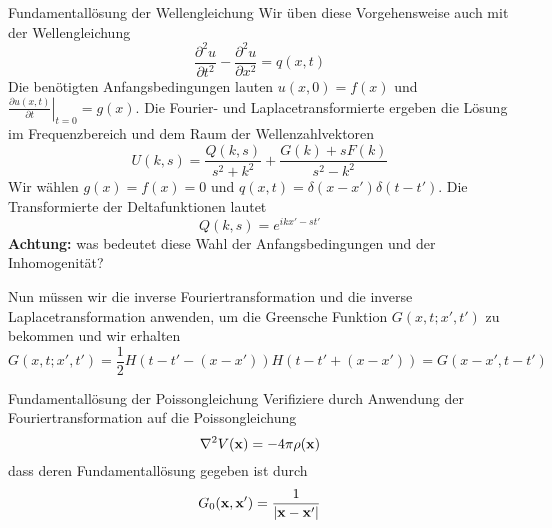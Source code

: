 \begin{example}{Fundamentallösung der Wellengleichung}
Wir üben diese Vorgehensweise auch mit der Wellengleichung
\begin{equation}
	\frac{\partial^2 u}{\partial t^2}-\frac{\partial^2 u}{\partial x^2}=q(x,t)
	\label{eqnwave}
\end{equation}
Die benötigten Anfangsbedingungen lauten $u(x,0)=f(x)$ und $\left.\frac{\partial
u(x,t)}{\partial t}\right|_{t=0}=g(x)$. Die Fourier- und Laplacetransformierte
ergeben die Lösung im Frequenzbereich und dem Raum der Wellenzahlvektoren 
\begin{equation}
	U(k,s)=\frac{Q(k,s)}{s^2+k^2}+\frac{G(k)+sF(k)}{s^2-k^2}
	\label{eqnuofkands}
\end{equation}
Wir wählen $g(x)=f(x)=0$ und $q(x,t)=\delta(x-x')\delta(t-t')$. Die
Transformierte der Deltafunktionen lautet
\[ Q(k,s)=e^{ikx'-st'}\]
{\bf Achtung:} was bedeutet diese Wahl der Anfangsbedingungen und der Inhomogenität?

Nun müssen wir die inverse Fouriertransformation und die inverse Laplacetransformation anwenden, um die 
Greensche Funktion $G(x,t;x',t')$ zu bekommen und wir erhalten
\begin{equation}
	G(x,t;x',t')=\frac{1}{2}H\left(t-t'-(x-x')\right)H\left(t-t'+(x-x')\right)=G(x-x',t-t')
	\label{eq:GFwave}
\end{equation}
\end{example}

\begin{example}{Fundamentallösung der Poissongleichung}
Verifiziere durch Anwendung der Fouriertransformation auf die Poissongleichung
\begin{equation}
	\nabla^2 V(\mathbf{x})=-4\pi\rho(\mathbf{x})
	\label{eq:Poisson}
\end{equation}
dass deren Fundamentallösung gegeben ist durch 
\begin{equation}
	G_0(\mathbf{x},\mathbf{x}')=\frac{1}{|\mathbf{x}-\mathbf{x}'|}
	\label{eq:FSPoisson}
\end{equation}
\end{example}

